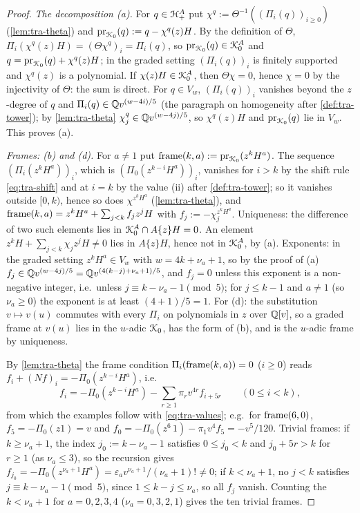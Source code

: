 \begin{proof}
\emph{The decomposition (a).} For $q\in\mathcal{H}^A_+$ put $\chi^q := \Theta^{-1}((\Pi_i(q))_{i\geq 0})$ (\cref{lem:tra-theta}) and $\mathrm{pr}_{\mathcal{K}_{0}}(q) := q-\chi^q(z)H$. By the definition of $\Theta$, $\Pi_i(\chi^q(z)H) = (\Theta\chi^q)_i = \Pi_i(q)$, so $\mathrm{pr}_{\mathcal{K}_{0}}(q)\in\mathcal{K}_{0}^A$ and $q = \mathrm{pr}_{\mathcal{K}_{0}}(q)+\chi^q(z)H$; in the graded setting $(\Pi_i(q))_i$ is finitely supported and $\chi^q(z)$ is a polynomial. If $\chi(z)H\in\mathcal{K}_{0}^A$, then $\Theta\chi = 0$, hence $\chi = 0$ by the injectivity of $\Theta$: the sum is direct. For $q\in V_w$, $(\Pi_i(q))_i$ vanishes beyond the $z$-degree of $q$ and $\Pi_i(q)\in\mathbb{Q} v^{(w-4i)/5}$ (the paragraph on homogeneity after \cref{def:tra-tower}); by \cref{lem:tra-theta} $\chi^q_j\in\mathbb{Q} v^{(w-4j)/5}$, so $\chi^q(z)H$ and $\mathrm{pr}_{\mathcal{K}_{0}}(q)$ lie in $V_w$. This proves (a).

\emph{Frames: (b) and (d).} For $a\neq 1$ put $\mathrm{frame}(k,a) := \mathrm{pr}_{\mathcal{K}_{0}}(z^kH^a)$. The sequence $(\Pi_i(z^kH^a))_i$, which is $(\Pi_0(z^{k-i}H^a))_i$, vanishes for $i>k$ by the shift rule \eqref{eq:tra-shift} and at $i = k$ by the value (ii) after \cref{def:tra-tower}; so it vanishes outside $[0,k)$, hence so does $\chi^{z^kH^a}$ (\cref{lem:tra-theta}), and $\mathrm{frame}(k,a) = z^kH^a+\sum_{j<k}f_jz^jH$ with $f_j := -\chi^{z^kH^a}_j$. Uniqueness: the difference of two such elements lies in $\mathcal{K}_{0}^A\cap A\{z\}H = 0$. An element $z^kH+\sum_{j<k}\chi_jz^jH\neq 0$ lies in $A\{z\}H$, hence not in $\mathcal{K}_{0}^A$, by (a). Exponents: in the graded setting $z^kH^a\in V_w$ with $w = 4k+\nu_a+1$, so by the proof of (a) $f_j\in\mathbb{Q} v^{(w-4j)/5} = \mathbb{Q} v^{(4(k-j)+\nu_a+1)/5}$, and $f_j = 0$ unless this exponent is a non-negative integer, i.e.\ unless $j\equiv k-\nu_a-1\pmod 5$; for $j\leq k-1$ and $a\neq 1$ (so $\nu_a\geq 0$) the exponent is at least $(4+1)/5 = 1$. For (d): the substitution $v\mapsto v(u)$ commutes with every $\Pi_i$ on polynomials in $z$ over $\mathbb{Q}[v]$, so a graded frame at $v(u)$ lies in the $u$-adic $\mathcal{K}_{0}$, has the form of (b), and is the $u$-adic frame by uniqueness.

By \cref{lem:tra-theta} the frame condition $\Pi_i(\mathrm{frame}(k,a)) = 0$ ($i\geq 0$) reads $f_i+(Nf)_i = -\Pi_0(z^{k-i}H^a)$, i.e.
\[
f_i = -\Pi_0(z^{k-i}H^a)-\sum_{r\geq 1}\pi_rv^{4r}f_{i+5r}\qquad(0\leq i<k),
\]
from which the examples follow with \eqref{eq:tra-values}; e.g.\ for $\mathrm{frame}(6,0)$, $f_5 = -\Pi_0(z1) = v$ and $f_0 = -\Pi_0(z^6\,1)-\pi_1v^4f_5 = -v^5/120$. Trivial frames: if $k\geq\nu_a+1$, the index $j_0 := k-\nu_a-1$ satisfies $0\leq j_0<k$ and $j_0+5r>k$ for $r\geq 1$ (as $\nu_a\leq 3$), so the recursion gives $f_{j_0} = -\Pi_0(z^{\nu_a+1}H^a) = \varepsilon_av^{\nu_a+1}/(\nu_a+1)!\neq 0$; if $k<\nu_a+1$, no $j<k$ satisfies $j\equiv k-\nu_a-1\pmod 5$, since $1\leq k-j\leq\nu_a$, so all $f_j$ vanish. Counting the $k<\nu_a+1$ for $a = 0,2,3,4$ ($\nu_a = 0,3,2,1$) gives the ten trivial frames.


\end{proof}
